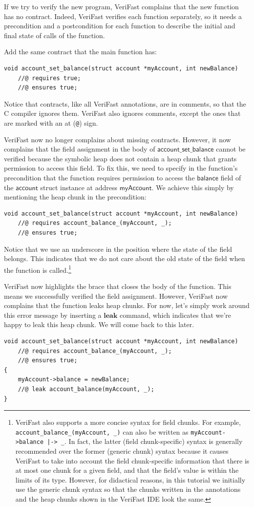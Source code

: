 \documentclass{article}
\begin{document}
If we try to verify the new program, VeriFast complains that
the new function has no contract. Indeed, VeriFast verifies
each function separately, so it needs a precondition and a
postcondition for each function to describe the initial and
final state of calls of the function.

Add the same contract that the main function has:
\begin{lstlisting}
void account_set_balance(struct account *myAccount, int newBalance)
    //@ requires true;
    //@ ensures true;
\end{lstlisting}
Notice that contracts, like all VeriFast annotations, are in
comments, so that the C compiler ignores them. VeriFast also
ignores comments, except the ones that are marked with an at
(\verb|@|) sign.

VeriFast now no longer complains about missing contracts.
However, it now complains that the field assignment in the body
of $\mathsf{account\_set\_balance}$ cannot be verified because
the symbolic heap does not contain a heap chunk that grants
permission to access this field. To fix this, we need to
specify in the function's precondition that the function
requires permission to access the $\mathsf{balance}$ field of
the $\mathsf{account}$ struct instance at address
$\mathsf{myAccount}$. We achieve this simply by mentioning the
heap chunk in the precondition:
\begin{lstlisting}
void account_set_balance(struct account *myAccount, int newBalance)
    //@ requires account_balance_(myAccount, _);
    //@ ensures true;
\end{lstlisting}
Notice that we use an underscore in the position where the
state of the field belongs. This indicates that we do not care
about the old state of the field when the function is
called.\footnote{VeriFast also supports a more concise syntax
for field chunks. For example,
\lstinline!account_balance_(myAccount, _)! can also be written as
\lstinline!myAccount->balance |-> _!.
In fact, the latter (field chunk-specific) syntax is generally recommended
over the former (generic chunk) syntax because it causes
VeriFast to take into account the field chunk-specific information that there is at most one
chunk for a given field, and that the field's value is within the limits of
its type. However, for didactical reasons, in this tutorial we initially use the generic
chunk syntax so that the chunks written in the annotations and the heap chunks shown in the VeriFast IDE look the same.}

VeriFast now highlights the brace that closes the body of the
function. This means we successfully verified the field
assignment. However, VeriFast now complains that the function
leaks heap chunks. For now, let's simply work around this error
message by inserting a $\mathbf{leak}$ command, which indicates
that we're happy to leak this heap chunk. We will come back to
this later.
\begin{lstlisting}
void account_set_balance(struct account *myAccount, int newBalance)
    //@ requires account_balance_(myAccount, _);
    //@ ensures true;
{
    myAccount->balance = newBalance;
    //@ leak account_balance(myAccount, _);
}
\end{lstlisting}
\end{document}
